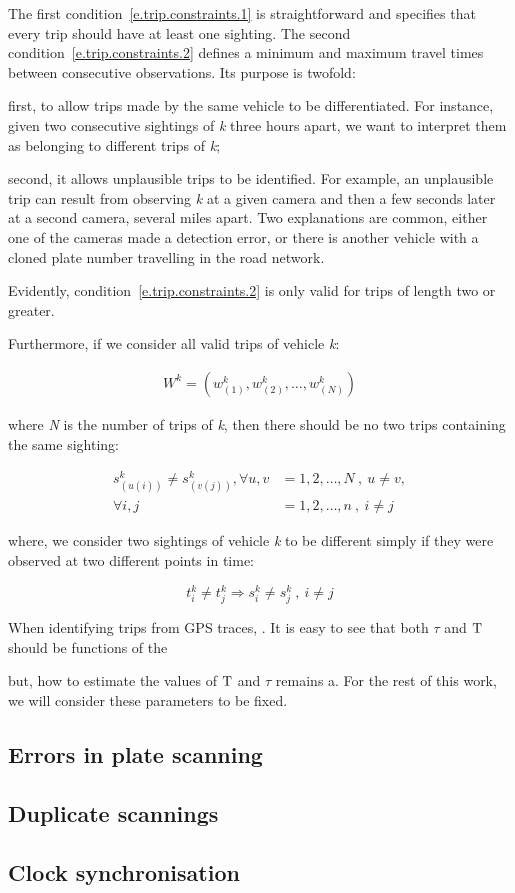 The first condition~\ref{e.trip.constraints.1} is straightforward and specifies that every trip should have at least one sighting. The second condition~\ref{e.trip.constraints.2} defines a minimum and maximum travel times between consecutive observations. Its purpose is twofold:
\begin{enumerate*}[label=(\roman*)]
  \item first, to allow trips made by the same vehicle to be differentiated. For instance, given two consecutive sightings of \emph{k} three hours apart, we want to interpret them as belonging to different trips of \emph{k};
  \item second, it allows unplausible trips to be identified. For example, an unplausible trip can result from observing \emph{k} at a given camera and then a few seconds later at a second camera, several miles apart. Two explanations are common, either one of the cameras made a detection error, or there is another vehicle with a cloned plate number travelling in the road network.
\end{enumerate*} Evidently, condition~\ref{e.trip.constraints.2} is only valid for trips of length two or greater.

Furthermore, if we consider all valid trips of vehicle \emph{k}:

\begin{align}
W^{k} = \left( w^{k}_{(1)}, w^{k}_{(2)}, \ldots, w^{k}_{(N)} \right) \label{e.trip.history}
\end{align}

where \emph{N} is the number of trips of \emph{k}, then there should be no two trips containing the same sighting:

\begin{align}
s^{k}_{(u(i))} \neq s^{k}_{(v(j))}, \forall u,v &= 1, 2, \ldots, N \ , \ u \neq v,  \label{e.trip.history.constraint} \\
\forall i,j &= 1, 2, \ldots, n \ , \ i \neq j \nonumber
\end{align}

where, we consider two sightings of vehicle \emph{k} to be different simply if they were observed at two different points in time:

\begin{equation} \label{e.sighting}
t^{k}_{i} \ne t^{k}_{j} \Rightarrow s^{k}_{i} \ne s^{k}_{j} \ , \ i \ne j
\end{equation}

When identifying trips from GPS traces, . It is easy to see that both $\tau$ and $\mathrm{T}$ should be functions of the

but, how to estimate the values of $\mathrm{T}$ and $\tau$ remains a. For the rest of this work, we will consider these parameters to be fixed.

\subsection{Errors in plate scanning}


\subsection{Duplicate scannings}

\subsection{Clock synchronisation}
